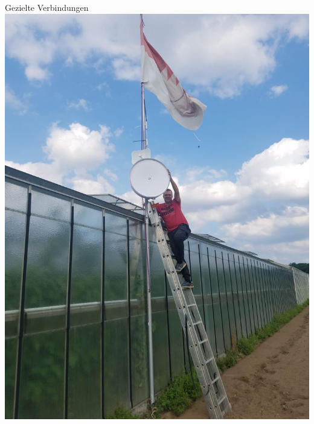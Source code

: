 \documentclass{beamer}
\begin{document}
	\begin{frame}[standout]{Gezielte Verbindungen}
		\includegraphics[height=0.75\framewidth]{media/p2p-treibhaus.jpg}
	\end{frame}
\end{document}
